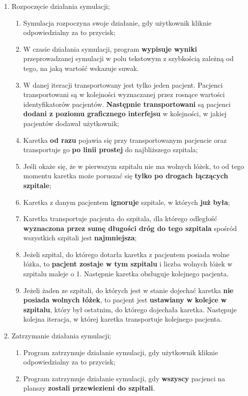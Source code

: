 \documentclass{article}
\begin{document}
\begin{enumerate}[label*=\arabic*.]
\begin{enumerate}[label*=\arabic*.]
\begin{enumerate}[label*=\arabic*.]
        \end{enumerate}
      \end{enumerate}
      \item Rozpoczęcie działania symulacji;
      \begin{enumerate}[label*=\arabic*.]
        \item Symulacja rozpoczyna swoje działanie, gdy użytkownik kliknie odpowiedzialny za to przycisk;
        \item W czasie działania symulacji, program \textbf{wypisuje wyniki} przeprowadzanej symulacji w polu tekstowym z szybkością zależną od tego, na jaką wartość wskazuje suwak.
        \item W danej iteracji transportowany jest tylko jeden pacjent. Pacjenci transportowani są w kolejności wyznaczanej przez rosnące wartości identyfikatorów pacjentów. \textbf{Następnie transportowani} są pacjenci \textbf{dodani z poziomu graficznego interfejsu} w kolejności, w jakiej pacjentów dodawał użytkownik;
        \item Karetka \textbf{od razu} pojawia się przy transportowanym pacjencie oraz transportuje go \textbf{po linii prostej} do najbliższego szpitala;
        \item Jeśli okaże się, że w pierwszym szpitalu nie ma wolnych łóżek, to od tego momentu karetka może poruszać się \textbf{tylko po drogach łączących szpitale};
        \item Karetka z danym pacjentem \textbf{ignoruje} szpitale, w których \textbf{już była};
        \item Karetka transportuje pacjenta do szpitala, dla którego odległość \textbf{wyznaczona przez sumę długości dróg do tego szpitala} spośród wszystkich szpitali jest \textbf{najmniejsza};
        \item Jeżeli szpital, do którego dotarła karetka z pacjentem posiada wolne łóżka, to \textbf{pacjent zostaje w tym szpitalu} i liczba wolnych łóżek w szpitalu maleje o 1. Następnie karetka obsługuje kolejnego pacjenta.
        \item Jeżeli żaden ze szpitali, do których jest w stanie dojechać karetka \textbf{nie posiada wolnych łóżek}, to pacjent jest \textbf{ustawiany w kolejce w szpitalu}, który był ostatnim, do którego dojechała karetka. Następuje kolejna iteracja, w której karetka transportuje kolejnego pacjenta.
      \end{enumerate}
      \item Zatrzymanie działania symulacji;
      \begin{enumerate}[label*=\arabic*.]
        \item Program zatrzymuje działanie symulacji, gdy użytkownik kliknie odpowiedzialny za to przycisk;
        \item Program zatrzymuje działanie symulacji, gdy \textbf{wszyscy} pacjenci na planszy \textbf{zostali przewiezieni do szpitali}.
      \end{enumerate}
    \end{enumerate}
\end{document}
